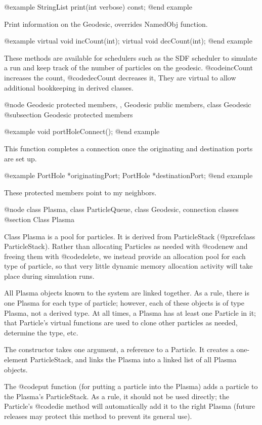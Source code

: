 @example
StringList print(int verbose) const;
@end example

Print information on the Geodesic, overrides NamedObj function.

@example
virtual void incCount(int);
virtual void decCount(int);
@end example

These methods are available for schedulers such as the SDF scheduler to
simulate a run and keep track of the number of particles on the
geodesic.  @code{incCount} increases the count, @code{decCount}
decreases it, They are virtual to allow additional bookkeeping in
derived classes.

@node Geodesic protected members,  , Geodesic public members, class Geodesic
@subsection Geodesic protected members

@example
void portHoleConnect();
@end example

This function completes a connection once the originating and
destination ports are set up.

@example
PortHole *originatingPort;
PortHole *destinationPort;
@end example

These protected members point to my neighbors.

@node class Plasma, class ParticleQueue, class Geodesic, connection classes
@section Class Plasma

Class Plasma is a pool for particles.  It is derived from ParticleStack
(@pxref{class ParticleStack}).
Rather than allocating Particles as needed with @code{new} and freeing
them with @code{delete}, we instead provide an allocation pool for each
type of particle, so that very little dynamic memory allocation activity
will take place during simulation runs.

All Plasma objects known to the system are linked together.  As a rule,
there is one Plasma for each type of particle; however, each of these
objects is of type Plasma, not a derived type.  At all times, a Plasma
has at least one Particle in it; that Particle's virtual functions are
used to clone other particles as needed, determine the type, etc.

The constructor takes one argument, a reference to a Particle.  It
creates a one-element ParticleStack, and links the Plasma into a linked
list of all Plasma objects.

The @code{put} function (for putting a particle into the Plasma) adds a
particle to the Plasma's ParticleStack.  As a rule, it should not be
used directly; the Particle's @code{die} method will automatically add
it to the right Plasma (future releases may protect this method to
prevent its general use).

